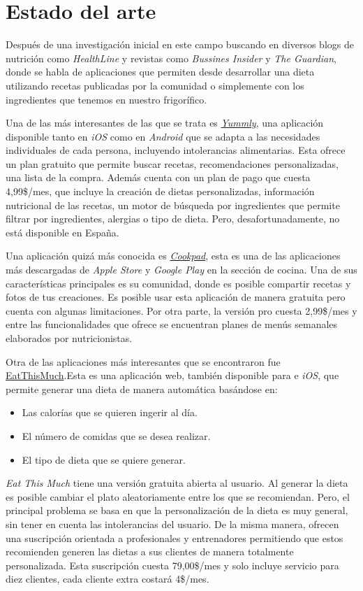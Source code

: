 \chapter{Estado del arte}
Después de una investigación inicial en este campo buscando en diversos blogs de nutrición como \emph{HealthLine}\cite{Healthline2022} y revistas como \emph{Bussines Insider}\cite{BusinessInsider2021} y \emph{The Guardian}, donde se habla de aplicaciones que permiten desde desarrollar una dieta utilizando recetas publicadas por la comunidad o simplemente con los ingredientes que tenemos en nuestro frigorífico. 

Una de las más interesantes de las que se trata es \href{https://www.yummly.com}{\emph{Yummly}}, una aplicación disponible tanto en \emph{iOS} como en \emph{Android} que se adapta a las necesidades individuales de cada persona, incluyendo intolerancias alimentarias\cite{TheGuardian2016}. Esta ofrece un plan gratuito que permite buscar recetas, recomendaciones personalizadas, una lista de la compra. Además cuenta con un plan de pago que cuesta 4,99\$/mes, que incluye la creación de dietas personalizadas, información nutricional de las recetas, un motor de búsqueda por ingredientes que permite filtrar por ingredientes, alergias o tipo de dieta. Pero, desafortunadamente, no está disponible en España. 

Una aplicación quizá más conocida es \href{https://cookpad.com/es/home}{\emph{Cookpad}}, esta es una de las aplicaciones más descargadas de \emph{Apple Store} y \emph{Google Play} en la sección de cocina. Una de sus características principales es su comunidad, donde es posible compartir recetas y fotos de tus creaciones. Es posible usar esta aplicación de manera gratuita pero cuenta con algunas limitaciones. Por otra parte, la versión pro cuesta 2,99\$/mes y entre las funcionalidades que ofrece se encuentran planes de menús semanales elaborados por nutricionistas.

Otra de las aplicaciones más interesantes que se encontraron fue \href{https://www.eatthismuch.com/}{EatThisMuch}.Esta es una aplicación web, también disponible para  e \emph{iOS}, que permite generar una dieta de manera automática basándose en:
\begin{itemize}
    \item Las calorías que se quieren ingerir al día.
    \item El número de comidas que se desea realizar.
    \item El tipo de dieta que se quiere generar.
\end{itemize}
\emph{Eat This Much} tiene una versión gratuita abierta al usuario. Al generar la dieta es posible cambiar el plato aleatoriamente entre los que se recomiendan. Pero, el principal problema se basa en que la personalización de la dieta es muy general, sin tener en cuenta las intolerancias del usuario. De la misma manera, ofrecen una suscripción orientada a profesionales y entrenadores permitiendo que estos recomienden generen las dietas a sus clientes de manera totalmente personalizada. Esta suscripción cuesta 79,00\$/mes y solo incluye servicio para diez clientes, cada cliente extra costará 4\$/mes. 

